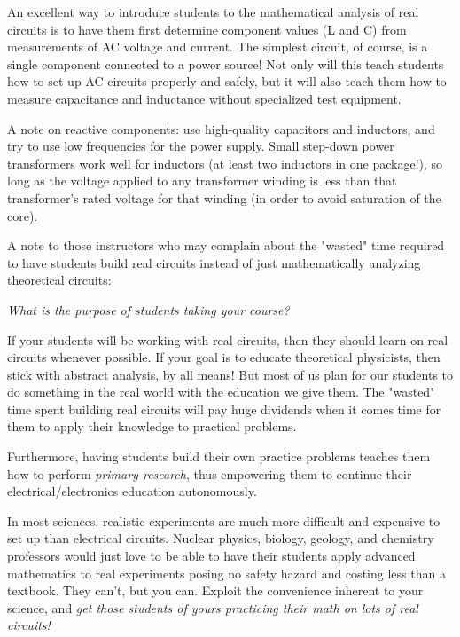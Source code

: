 An excellent way to introduce students to the mathematical analysis of real circuits is to have them first determine component values (L and C) from measurements of AC voltage and current.  The simplest circuit, of course, is a single component connected to a power source!  Not only will this teach students how to set up AC circuits properly and safely, but it will also teach them how to measure capacitance and inductance without specialized test equipment.

A note on reactive components: use high-quality capacitors and inductors, and try to use low frequencies for the power supply.  Small step-down power transformers work well for inductors (at least two inductors in one package!), so long as the voltage applied to any transformer winding is less than that transformer's rated voltage for that winding (in order to avoid saturation of the core).

\vskip 10pt

A note to those instructors who may complain about the "wasted" time required to have students build real circuits instead of just mathematically analyzing theoretical circuits:

\vskip 10pt

\hskip 1in
{\it What is the purpose of students taking your course?}

\vskip 10pt

If your students will be working with real circuits, then they should learn on real circuits whenever possible.  If your goal is to educate theoretical physicists, then stick with abstract analysis, by all means!  But most of us plan for our students to do something in the real world with the education we give them.  The "wasted" time spent building real circuits will pay huge dividends when it comes time for them to apply their knowledge to practical problems.

Furthermore, having students build their own practice problems teaches them how to perform {\it primary research}, thus empowering them to continue their electrical/electronics education autonomously.

In most sciences, realistic experiments are much more difficult and expensive to set up than electrical circuits.  Nuclear physics, biology, geology, and chemistry professors would just love to be able to have their students apply advanced mathematics to real experiments posing no safety hazard and costing less than a textbook.  They can't, but you can.  Exploit the convenience inherent to your science, and {\it get those students of yours practicing their math on lots of real circuits!}




